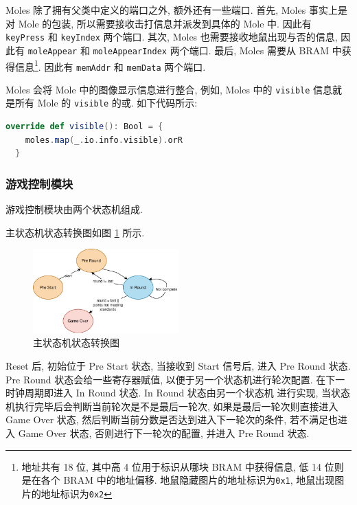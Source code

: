 Moles 除了拥有父类中定义的端口之外, 额外还有一些端口. 首先, Moles 事实上是对 Mole 的包装, 
所以需要接收击打信息并派发到具体的 Mole 中. 因此有 \texttt{keyPress} 和 \texttt{keyIndex}
两个端口. 其次, Moles 也需要接收地鼠出现与否的信息, 因此有 \texttt{moleAppear} 和 \texttt{moleAppearIndex}
两个端口. 最后, Moles 需要从 BRAM 中获得信息\footnote[1]{地址共有 18 位, 其中高 4 位用于标识从哪块 BRAM 中获得信息, 
低 14 位则是在各个 BRAM 中的地址偏移. 地鼠隐藏图片的地址标识为\texttt{0x1}, 地鼠出现图片的地址标识为\texttt{0x2}}. 
因此有 \texttt{memAddr} 和 \texttt{memData} 两个端口.

Moles 会将 Mole 中的图像显示信息进行整合, 例如, Moles 中的 \texttt{visible} 信息就是所有 Mole 的
\texttt{visible} 的或. 如下代码所示: 

\begin{lstlisting}[language=scala]
  override def visible(): Bool = {
    moles.map(_.io.info.visible).orR
  }
\end{lstlisting}

\subsubsection{游戏控制模块}

游戏控制模块由两个状态机组成. 

主状态机状态转换图如图 \ref{fig:primary-fsm} 所示. 

\begin{figure}[htbp]
  \centering
  \includegraphics[width=0.5\textwidth]{res/img/primary-fsm.pdf}
  \caption{主状态机状态转换图}
  \label{fig:primary-fsm}
\end{figure}

Reset 后, 初始位于 Pre Start 状态, 当接收到 Start 信号后, 进入 Pre Round 状态. 
Pre Round 状态会给一些寄存器赋值, 以便于另一个状态机进行轮次配置. 在下一时钟周期即进入 In Round 状态. In Round 状态由另一个状态机
进行实现, 当状态机执行完毕后会判断当前轮次是不是最后一轮次, 如果是最后一轮次则直接进入
Game Over 状态, 然后判断当前分数是否达到进入下一轮次的条件, 若不满足也进入 Game Over 状态, 
否则进行下一轮次的配置, 并进入 Pre Round 状态.

